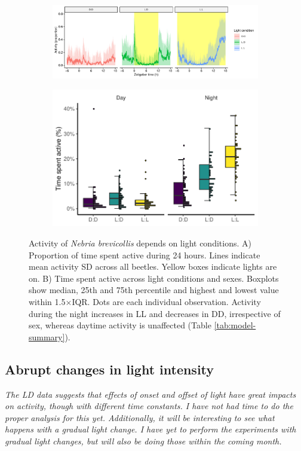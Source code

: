 \begin{figure}
\centering
    \begin{subfigure}{\linewidth}
        \caption{}
        \includegraphics[width = \hsize]{src/figures/activity-all.pdf}
        \label{subfig:activity-all}
    \end{subfigure}

    \begin{subfigure}{\linewidth}
        \caption{}
        \includegraphics[width = \hsize]{src/figures/night-day.pdf}
        \label{subfig:night-day}
    \end{subfigure}

    \caption{Activity of \textit{Nebria brevicollis} depends on light conditions. A) Proportion of time spent active during 24 hours. Lines indicate mean activity \textpm SD across all beetles. Yellow boxes indicate lights are on. B) Time spent active across light conditions and sexes. Boxplots show median, 25th and 75th percentile and highest and lowest value within 1.5$\times$IQR. Dots are each individual observation. Activity during the night increases in LL and decreases in DD, irrespective of sex, whereas daytime activity is unaffected (Table \ref{tab:model-summary}).}
    \label{fig:activity-all}
\end{figure}

\subsection{Abrupt changes in light intensity}
\textit{The LD data suggests that effects of onset and offset of light have great impacts on activity, though with different time constants.
I have not had time to do the proper analysis for this yet. Additionally, it will be interesting to see what happens with a gradual light change. I have yet to perform the experiments with gradual light changes, but will also be doing those within the coming month.}


